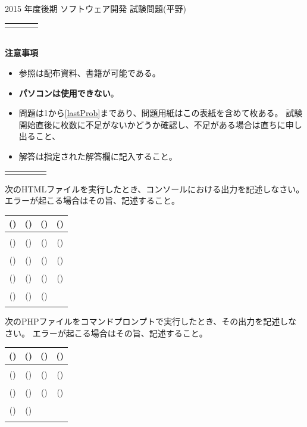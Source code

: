 \documentclass[a4j,12pt]{jreport}
\newcommand{\SetTitle}[5]{%
        \begin{center}
        {\Large #1 年度#2 #3 試験問題(#4)}\\%
\setlength{\arrayrulewidth}{0.002\paperwidth}\setlength{\tabcolsep}{0mm}
  \begin{tabular}[t]{|*{2}{p{0.175\paperwidth}|}%
                      p{0.22\paperwidth}|p{0.11\paperwidth}|}
  \hline
  \wellspaceside{{学科$\bullet$組}}&
  \wellspaceside{学籍番号} &
  \wellspaceside{氏名} & \wellspaceside{採点}\\ \hline
  \rule{0mm}{0.033\paperheight}&  & & \\ \hline
  \end{tabular}\\[1em]
 {\bfseries 注意事項}
       \end{center}
 \begin{itemize}
 #5
\end{itemize} 
\vfill
\begin{center}
\setlength{\arrayrulewidth}{0.002\paperwidth}\setlength{\tabcolsep}{0mm}
\begin{tabular}{|*{5}{c|}}
\hline
\makebox[5em]{1} & \makebox[5em]{2} & \makebox[5em]{3} &
\makebox[5em]{4} & \makebox[5em]{5}\\\hline
 \rule[-2em]{0em}{4em}&&&&\\ \hline
\end{tabular}
\end{center}
\newpage
}
\newcounter{No}
\newcommand{\ShowNo}{
(\arabic{No})\stepcounter{No}&
(\arabic{No})\stepcounter{No}&
(\arabic{No})\stepcounter{No}&
(\arabic{No})\stepcounter{No}\\ \hline
   \makebox[3.5cm]{\rule{0cm}{2cm}}&
   \makebox[3.5cm]{\rule{0cm}{1cm}}&
   \makebox[3.5cm]{\rule{0cm}{1cm}}&
   \makebox[3.5cm]{\rule{0cm}{1cm}} \\ \hline
}
\newcommand{\ShowNoiii}{
(\arabic{No})\stepcounter{No}&
(\arabic{No})\stepcounter{No}&
(\arabic{No})\stepcounter{No}\\ \cline{1-3}
   \makebox[3.5cm]{\rule{0cm}{2cm}}&
   \makebox[3.5cm]{\rule{0cm}{1cm}}&
   \makebox[3.5cm]{\rule{0cm}{1cm}} \\ \cline{1-3}
}
\newcommand{\ShowNoii}{
(\arabic{No})\stepcounter{No}&
(\arabic{No})\stepcounter{No}\\ \cline{1-2}
   \makebox[3.5cm]{\rule{0cm}{2cm}}&
   \makebox[3.5cm]{\rule{0cm}{1cm}} \\ \cline{1-2}
}
\begin{document}
\SetTitle{2015}{後期}{ソフトウェア開発}{平野}
{\item 参照は配布資料、書籍が可能である。
\item {\bfseries パソコンは使用できない}。
\item 問題は1から\ref{lastProb}まであり、問題用紙はこの表紙を含めて\pageref{lastPage}枚ある。
試験開始直後に枚数に不足がないかどうか確認し、不足がある場合は直ちに申し出ること、
\item 解答は指定された解答欄に記入すること。}
\begin{Prob}\upshape
 次のHTMLファイルを実行したとき、コンソールにおける出力を記述しなさい。
 エラーが起こる場合はその旨、記述すること。
 {\small
 }
\setcounter{No}{1}
\begin{center}
  \begin{tabular}{|c|c|c|c|}\hline
\ShowNo
\ShowNo
\ShowNo
\ShowNo
\ShowNoiii
 \end{tabular}
\end{center}\newpage
\end{Prob}
\begin{Prob}\upshape
 次のPHPファイルをコマンドプロンプトで実行したとき、その出力を記述しなさい。
 エラーが起こる場合はその旨、記述すること。
 {\small
 }
\setcounter{No}{1}
\begin{center}
  \begin{tabular}{|c|c|c|c|}\hline
\ShowNo
\ShowNo
\ShowNo
\ShowNoii
 \end{tabular}
\end{center}\newpage
\end{Prob}
\end{document}
